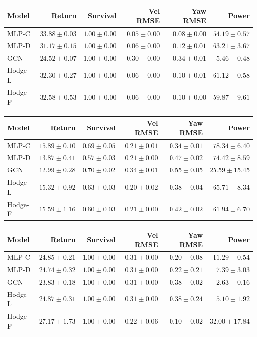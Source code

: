 \begin{tabular}{lrrrrr}
\toprule
Model & Return & Survival & Vel RMSE & Yaw RMSE & Power \\
\midrule
MLP-C & $33.88 \pm 0.03$ & $1.00 \pm 0.00$ & $0.05 \pm 0.00$ & $0.08 \pm 0.00$ & $54.19 \pm 0.57$ \\
MLP-D & $31.17 \pm 0.15$ & $1.00 \pm 0.00$ & $0.06 \pm 0.00$ & $0.12 \pm 0.01$ & $63.21 \pm 3.67$ \\
GCN & $24.52 \pm 0.07$ & $1.00 \pm 0.00$ & $0.30 \pm 0.00$ & $0.34 \pm 0.01$ & $5.46 \pm 0.48$ \\
Hodge-L & $32.30 \pm 0.27$ & $1.00 \pm 0.00$ & $0.06 \pm 0.00$ & $0.10 \pm 0.01$ & $61.12 \pm 0.58$ \\
Hodge-F & $32.58 \pm 0.53$ & $1.00 \pm 0.00$ & $0.06 \pm 0.00$ & $0.10 \pm 0.00$ & $59.87 \pm 9.61$ \\
\bottomrule
\end{tabular}

\begin{tabular}{lrrrrr}
\toprule
Model & Return & Survival & Vel RMSE & Yaw RMSE & Power \\
\midrule
MLP-C & $16.89 \pm 0.10$ & $0.69 \pm 0.05$ & $0.21 \pm 0.01$ & $0.34 \pm 0.01$ & $78.34 \pm 6.40$ \\
MLP-D & $13.87 \pm 0.41$ & $0.57 \pm 0.03$ & $0.21 \pm 0.00$ & $0.47 \pm 0.02$ & $74.42 \pm 8.59$ \\
GCN & $12.99 \pm 0.28$ & $0.70 \pm 0.02$ & $0.34 \pm 0.01$ & $0.55 \pm 0.05$ & $25.59 \pm 15.45$ \\
Hodge-L & $15.32 \pm 0.92$ & $0.63 \pm 0.03$ & $0.20 \pm 0.02$ & $0.38 \pm 0.04$ & $65.71 \pm 8.34$ \\
Hodge-F & $15.59 \pm 1.16$ & $0.60 \pm 0.03$ & $0.21 \pm 0.00$ & $0.42 \pm 0.02$ & $61.94 \pm 6.70$ \\
\bottomrule
\end{tabular}

\begin{tabular}{lrrrrr}
\toprule
Model & Return & Survival & Vel RMSE & Yaw RMSE & Power \\
\midrule
MLP-C & $24.85 \pm 0.21$ & $1.00 \pm 0.00$ & $0.31 \pm 0.00$ & $0.20 \pm 0.08$ & $11.29 \pm 0.54$ \\
MLP-D & $24.74 \pm 0.32$ & $1.00 \pm 0.00$ & $0.31 \pm 0.00$ & $0.22 \pm 0.21$ & $7.39 \pm 3.03$ \\
GCN & $23.83 \pm 0.18$ & $1.00 \pm 0.00$ & $0.31 \pm 0.00$ & $0.38 \pm 0.02$ & $2.63 \pm 0.16$ \\
Hodge-L & $24.87 \pm 0.31$ & $1.00 \pm 0.00$ & $0.31 \pm 0.00$ & $0.38 \pm 0.24$ & $5.10 \pm 1.92$ \\
Hodge-F & $27.17 \pm 1.73$ & $1.00 \pm 0.00$ & $0.22 \pm 0.06$ & $0.10 \pm 0.02$ & $32.00 \pm 17.84$ \\
\bottomrule
\end{tabular}

